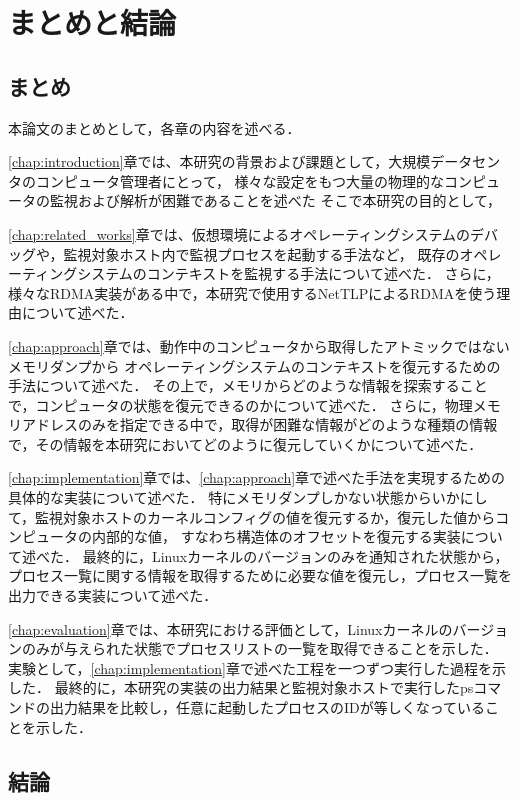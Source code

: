 \chapter{まとめと結論}
\label{chap:conclusion}

\section{まとめ}

本論文のまとめとして，各章の内容を述べる．

\ref{chap:introduction}章では、本研究の背景および課題として，大規模データセンタのコンピュータ管理者にとって，
様々な設定をもつ大量の物理的なコンピュータの監視および解析が困難であることを述べた
そこで本研究の目的として，

\ref{chap:related_works}章では、仮想環境によるオペレーティングシステムのデバッグや，監視対象ホスト内で監視プロセスを起動する手法など，
既存のオペレーティングシステムのコンテキストを監視する手法について述べた．
さらに，様々なRDMA実装がある中で，本研究で使用するNetTLPによるRDMAを使う理由について述べた．

\ref{chap:approach}章では、動作中のコンピュータから取得したアトミックではないメモリダンプから
オペレーティングシステムのコンテキストを復元するための手法について述べた．
その上で，メモリからどのような情報を探索することで，コンピュータの状態を復元できるのかについて述べた．
さらに，物理メモリアドレスのみを指定できる中で，取得が困難な情報がどのような種類の情報で，その情報を本研究においてどのように復元していくかについて述べた．

\ref{chap:implementation}章では、\ref{chap:approach}章で述べた手法を実現するための具体的な実装について述べた．
特にメモリダンプしかない状態からいかにして，監視対象ホストのカーネルコンフィグの値を復元するか，復元した値からコンピュータの内部的な値，
すなわち構造体のオフセットを復元する実装について述べた．
最終的に，Linuxカーネルのバージョンのみを通知された状態から，プロセス一覧に関する情報を取得するために必要な値を復元し，プロセス一覧を出力できる実装について述べた．

\ref{chap:evaluation}章では、本研究における評価として，Linuxカーネルのバージョンのみが与えられた状態でプロセスリストの一覧を取得できることを示した．
実験として，\ref{chap:implementation}章で述べた工程を一つずつ実行した過程を示した．
最終的に，本研究の実装の出力結果と監視対象ホストで実行したpsコマンドの出力結果を比較し，任意に起動したプロセスのIDが等しくなっていることを示した．

\section{結論}


